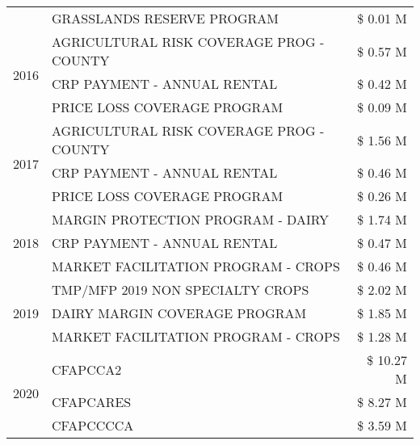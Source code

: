 \begin{tabular}{llr}
 & GRASSLANDS RESERVE PROGRAM & \$ 0.01 M \\
\cline{1-3}
\multirow[t]{3}{*}{2016} & AGRICULTURAL RISK COVERAGE PROG - COUNTY & \$ 0.57 M \\
 & CRP PAYMENT - ANNUAL RENTAL & \$ 0.42 M \\
 & PRICE LOSS COVERAGE PROGRAM & \$ 0.09 M \\
\cline{1-3}
\multirow[t]{3}{*}{2017} & AGRICULTURAL RISK COVERAGE PROG - COUNTY & \$ 1.56 M \\
 & CRP PAYMENT - ANNUAL RENTAL & \$ 0.46 M \\
 & PRICE LOSS COVERAGE PROGRAM & \$ 0.26 M \\
\cline{1-3}
\multirow[t]{3}{*}{2018} & MARGIN PROTECTION PROGRAM - DAIRY & \$ 1.74 M \\
 & CRP PAYMENT - ANNUAL RENTAL & \$ 0.47 M \\
 & MARKET FACILITATION PROGRAM - CROPS & \$ 0.46 M \\
\cline{1-3}
\multirow[t]{3}{*}{2019} & TMP/MFP 2019 NON SPECIALTY CROPS & \$ 2.02 M \\
 & DAIRY MARGIN COVERAGE PROGRAM & \$ 1.85 M \\
 & MARKET FACILITATION PROGRAM - CROPS & \$ 1.28 M \\
\cline{1-3}
\multirow[t]{3}{*}{2020} & CFAPCCA2 & \$ 10.27 M \\
 & CFAPCARES & \$ 8.27 M \\
 & CFAPCCCCA & \$ 3.59 M \\
\cline{1-3}
\bottomrule
\end{tabular}
